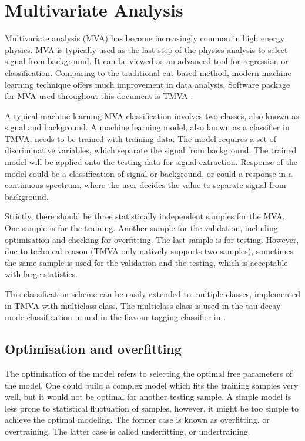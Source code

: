 \section{Multivariate Analysis}
\label{sec:pandoraMVA}

Multivariate analysis (MVA) has become increasingly common in high energy physics. MVA is typically used as the last step of the physics analysis to select signal from background. It can be viewed as an advanced tool for regression or classification. Comparing to the traditional cut based method, modern machine learning technique offers much improvement in data analysis. Software package for MVA used throughout this document is TMVA \cite{Hocker:2007ht}.

A typical machine learning MVA classification involves two classes, also known as signal and background. A machine learning model, also known as a classifier in TMVA, needs to be trained with training data. The model requires a set of discriminative variables, which separate the signal from background. The trained model will be applied onto the testing data for signal extraction. Response of the model could be a classification of signal or background, or could  a response in a continuous spectrum, where the user decides the value to separate signal from background.

Strictly, there should be three statistically independent samples for the MVA. One sample is for the training. Another sample for the validation, including optimisation and checking for overfitting. The last sample is for testing. However, due to technical reason (TMVA only natively supports two samples), sometimes the same sample is used for the validation and the testing, which is acceptable with large statistics.

This classification scheme can be easily extended to multiple classes, implemented in TMVA with multiclass class. The multiclass class is used in the tau decay mode classification in \Section{} and in the flavour tagging classifier in .

\subsection{Optimisation and overfitting}
\label{sec:pandoraMVAoptimisation}

The optimisation of the model refers to selecting the optimal free parameters of the model. One could build a complex model which fits the training samples very well, but it would not be optimal for another testing sample. A simple model is less prone to statistical fluctuation of samples, however, it might be too simple to achieve the optimal modeling. The former case is known as overfitting, or overtraining. The latter case is called underfitting, or undertraining.

